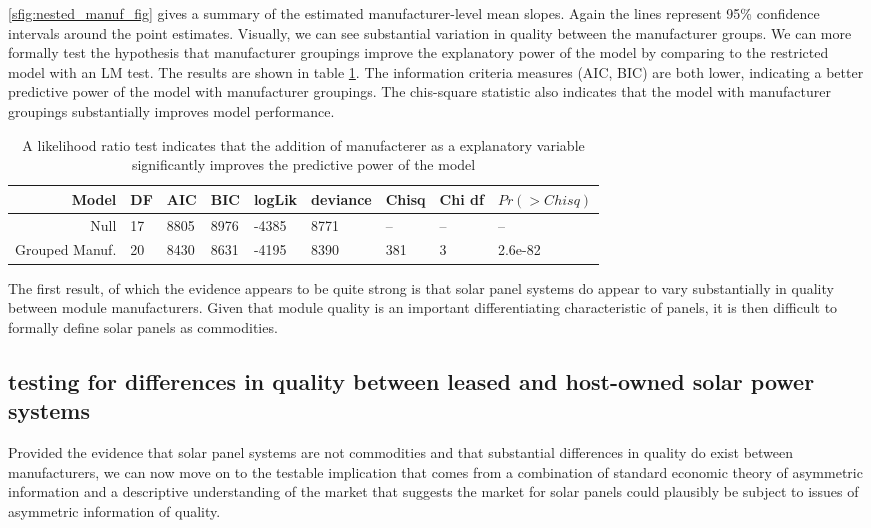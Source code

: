 \documentclass[12pt]{article}
\begin{document}
\ref{sfig:nested_manuf_fig} gives a summary of the estimated manufacturer-level mean slopes. Again the lines represent 95\% confidence intervals around the point estimates. Visually, we can see substantial variation in quality between the manufacturer groups. We can more formally test the hypothesis that manufacturer groupings improve the explanatory power of the model by comparing to the restricted model with an LM test. The results are shown in table \ref{tbl:lm_commodity}. The information criteria measures (AIC, BIC) are both lower, indicating a better predictive power of the model with manufacturer groupings. The chis-square statistic also indicates that the model with manufacturer groupings substantially improves model performance.

\begin{table}
  \begin{tabular}{rllllllll}
  \toprule
    Model &  DF &   AIC &   BIC &  logLik &  deviance &  Chisq &  Chi df &  $Pr(>Chisq)$ \\
    \midrule
             Null &  17 &  8805 &  8976 &   -4385 &      8771 &     -- &      -- &          -- \\
    Grouped Manuf. &  20 &  8430 &  8631 &   -4195 &      8390 &    381 &       3 &     2.6e-82 \\
  \bottomrule
  \end{tabular}
  \label{tbl:lm_commodity}
  \caption{A likelihood ratio test indicates that the addition of manufacterer as a explanatory variable significantly improves the predictive power of the model}
\end{table}

The first result, of which the evidence appears to be quite strong is that solar panel systems do appear to vary substantially in quality between module manufacturers. Given that module quality is an important differentiating characteristic of panels, it is then difficult to formally define solar panels as commodities.

\subsection{testing for differences in quality between leased and host-owned solar power systems}

Provided the evidence that solar panel systems are not commodities and that substantial differences in quality do exist between manufacturers, we can now move on to the testable implication that comes from a combination of standard economic theory of asymmetric information and a descriptive understanding of the market that suggests the market for solar panels could plausibly be subject to issues of asymmetric information of quality.
\end{document}
